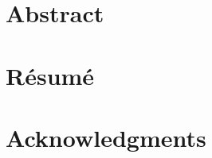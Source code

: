 \documentclass[
	fontsize=10pt, %
	twoside=true, %
	secnumdepth=2, %
	parskip=full-, %
]{kaobook}
\begin{document}




\chapter*{Abstract}



\chapter*{Résumé}



\chapter*{Acknowledgments}




\begingroup %

\setlength{\textheight}{230\vscale} %

\etocstandarddisplaystyle %
\etocstandardlines %
\end{document}
